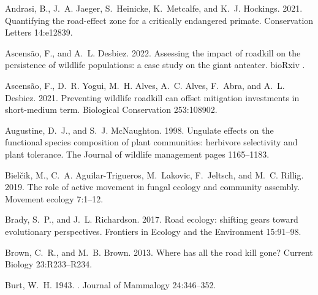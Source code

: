 \documentclass[11pt]{article}
\begin{document}
%

\begin{thebibliography}{40}
\providecommand{\natexlab}[1]{#1}

Andrasi, B., J.~A. Jaeger, S.~Heinicke, K.~Metcalfe, and K.~J. Hockings. 2021.
\newblock Quantifying the road-effect zone for a critically endangered primate.
\newblock Conservation Letters 14:e12839.

Ascens{\~a}o, F., and A.~L. Desbiez. 2022.
\newblock Assessing the impact of roadkill on the persistence of wildlife
  populations: a case study on the giant anteater.
\newblock bioRxiv .

Ascens{\~a}o, F., D.~R. Yogui, M.~H. Alves, A.~C. Alves, F.~Abra, and A.~L.
  Desbiez. 2021.
\newblock Preventing wildlife roadkill can offset mitigation investments in
  short-medium term.
\newblock Biological Conservation 253:108902.

Augustine, D.~J., and S.~J. McNaughton. 1998.
\newblock Ungulate effects on the functional species composition of plant
  communities: herbivore selectivity and plant tolerance.
\newblock The Journal of wildlife management pages 1165--1183.

Biel{\v{c}}ik, M., C.~A. Aguilar-Trigueros, M.~Lakovic, F.~Jeltsch, and M.~C.
  Rillig. 2019.
\newblock The role of active movement in fungal ecology and community assembly.
\newblock Movement ecology 7:1--12.

Brady, S.~P., and J.~L. Richardson. 2017.
\newblock Road ecology: shifting gears toward evolutionary perspectives.
\newblock Frontiers in Ecology and the Environment 15:91--98.

Brown, C.~R., and M.~B. Brown. 2013.
\newblock Where has all the road kill gone?
\newblock Current Biology 23:R233--R234.

Burt, W.~H. 1943.
.
\newblock Journal of Mammalogy 24:346--352.


\end{thebibliography}
\end{document}
